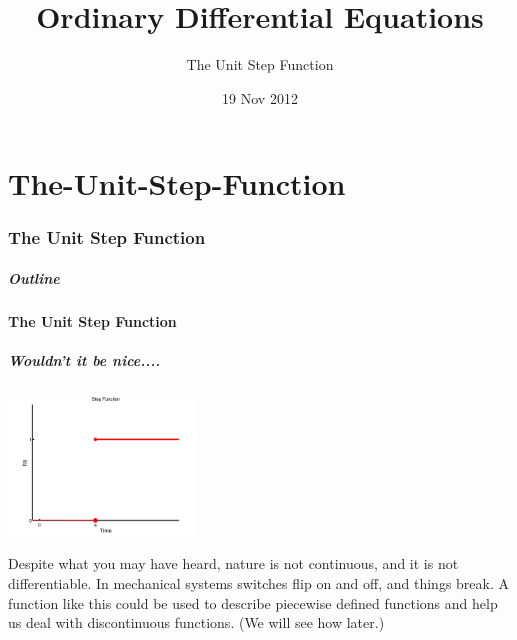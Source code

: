 \part{The-Unit-Step-Function}
\section{The Unit Step Function}

\title{Ordinary Differential Equations}
\subtitle{The Unit Step Function}
\date{19 Nov 2012}

\begin{frame}
  \titlepage
\end{frame}

\begin{frame}
  \frametitle{Outline}
  \tableofcontents[ currentsection ]
\end{frame}


\subsection{The Unit Step Function}


\begin{frame}
  \frametitle{Wouldn't it be nice....}

  \centerline{\includegraphics[width=5cm]{img/unitStepAta}}

  {%

    Despite what you may have heard, nature is not continuous, and it
    is not differentiable.  In mechanical systems switches flip on and
    off, and things break. A function like this could be used to
    describe piecewise defined functions and help us deal with
    discontinuous functions. (We will see how later.)

  }

\end{frame}

